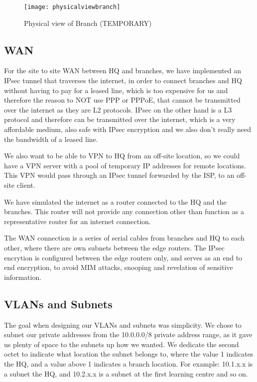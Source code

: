 \begin{figure}[H]
\caption{Physical view of Branch (TEMPORARY)}
\centreing
\texttt{[image: physicalviewbranch]}
\label{physicalviewbranch}
\end{figure}


\subsection{WAN}

For the site to site WAN between HQ and branches, we have implemented an IPsec tunnel that traverses the internet, in order to connect branches and HQ without having to pay for a leased line, which is too expensive for us and therefore the reason to NOT use PPP or PPPoE, that cannot be transmitted over the internet as they are L2 protocols. IPsec on the other hand is a L3 protocol and therefore can be transmitted over the internet, which is a very affordable medium, also safe with IPsec encryption and we also don't really need the bandwidth of a leased line.

We also want to be able to VPN to HQ from an off-site location, so we could have a VPN server with a pool of temporary IP addresses for remote locations. This VPN would pass through an IPsec tunnel forwarded by the ISP, to an off-site client.

We have simulated the internet as a router connected to the HQ and the branches. This router will not provide any connection other than function as a representative router for an internet connection. 

The WAN connection is a series of serial cables from branches and HQ to each other, where there are own subnets between the edge routers. The IPsec encrytion is configured between the edge routers only, and serves as an end to end encryption, to avoid MIM attacks, snooping and revelation of sensitive information.

\subsection{VLANs and Subnets}

The goal when designing our VLANs and subnets was simplicity. We chose to subnet our private addresses from the 10.0.0.0/8 private address range, as it gave us plenty of space to the subnets up how we wanted.
We dedicate the second octet to indicate what location the subnet belongs to, where the value 1 indicates the HQ, and a value above 1 indicates a branch location. For example: 10.1.x.x is a subnet the HQ, and 10.2.x.x is a subnet at the first learning centre and so on.

